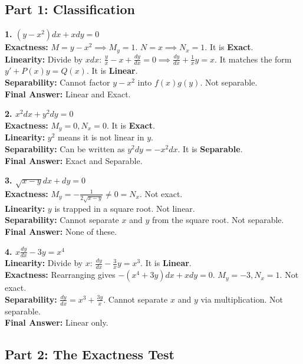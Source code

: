 \documentclass[11pt]{article}
\begin{document}
\subsection*{Part 1: Classification}

\textbf{1. $(y - x^2)dx + x dy = 0$} \\
\textbf{Exactness:} $M = y - x^2 \implies M_y = 1$. $N = x \implies N_x = 1$. It is \textbf{Exact}. \\
\textbf{Linearity:} Divide by $xdx$: $\frac{y}{x} - x + \frac{dy}{dx} = 0 \implies \frac{dy}{dx} + \frac{1}{x}y = x$. It matches the form $y' + P(x)y = Q(x)$. It is \textbf{Linear}. \\
\textbf{Separability:} Cannot factor $y - x^2$ into $f(x)g(y)$. Not separable. \\
\textbf{Final Answer:} Linear and Exact.

\textbf{2. $x^2 dx + y^2 dy = 0$} \\
\textbf{Exactness:} $M_y = 0, N_x = 0$. It is \textbf{Exact}. \\
\textbf{Linearity:} $y^2$ means it is not linear in $y$. \\
\textbf{Separability:} Can be written as $y^2 dy = -x^2 dx$. It is \textbf{Separable}. \\
\textbf{Final Answer:} Exact and Separable.

\textbf{3. $\sqrt{x-y} dx + dy = 0$} \\
\textbf{Exactness:} $M_y = -\frac{1}{2\sqrt{x-y}} \neq 0 = N_x$. Not exact. \\
\textbf{Linearity:} $y$ is trapped in a square root. Not linear. \\
\textbf{Separability:} Cannot separate $x$ and $y$ from the square root. Not separable. \\
\textbf{Final Answer:} None of these.

\textbf{4. $x \frac{dy}{dx} - 3y = x^4$} \\
\textbf{Linearity:} Divide by $x$: $\frac{dy}{dx} - \frac{3}{x}y = x^3$. It is \textbf{Linear}. \\
\textbf{Exactness:} Rearranging gives $-(x^4 + 3y)dx + x dy = 0$. $M_y = -3, N_x = 1$. Not exact. \\
\textbf{Separability:} $\frac{dy}{dx} = x^3 + \frac{3y}{x}$. Cannot separate $x$ and $y$ via multiplication. Not separable. \\
\textbf{Final Answer:} Linear only.

\subsection*{Part 2: The Exactness Test}
\end{document}
